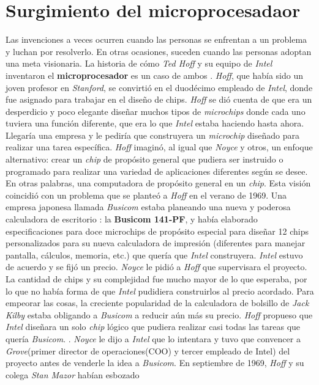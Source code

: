 \section{Surgimiento del microprocesadaor}
Las invenciones a veces ocurren cuando las personas se enfrentan a un problema y luchan por resolverlo. En otras ocasiones, suceden 
cuando las personas adoptan una meta visionaria. La historia de cómo \emph{Ted Hoff} y su equipo de \emph{Intel} inventaron el \textbf
{microprocesador} es un caso de ambos . \emph{Hoff}, que había sido un joven profesor en \emph{Stanford}, se
convirtió en el duodécimo empleado de \emph{Intel}, donde fue asignado para trabajar en el diseño de chips. \emph{Hoff} se dió cuenta de que era un
desperdicio y poco elegante diseñar muchos tipos de \emph{microchips} donde cada uno tuviera una función diferente,  que era lo que \emph{Intel} 
estaba haciendo hasta ahora. Llegaría una empresa y le pediría que construyera un \emph{microchip} diseñado para realizar una tarea
específica. \emph{Hoff} imaginó, al igual que \emph{Noyce} y otros, un enfoque alternativo: crear un \emph{chip} de propósito general que pudiera
ser instruido o programado para realizar una variedad de aplicaciones diferentes según se desee. En otras palabras, una computadora de propósito
general en un \emph{chip}. Esta visión coincidió con un problema que se planteó a \emph{Hoff} en el verano de 1969. Una empresa japonesa llamada
\emph {Busicom} estaba planeando una nueva y poderosa calculadora de escritorio : la \textbf{Busicom 141-PF}, y había elaborado especificaciones para
doce microchips de propósito especial para diseñar 12 chips personalizados para su nueva calculadora de impresión (diferentes para manejar pantalla,
cálculos, memoria, etc.) que quería que \emph{Intel} construyera. \emph{Intel} estuvo de acuerdo y se fijó un precio. \emph{Noyce} le pidió a \emph
{Hoff} que supervisara el proyecto. La cantidad de chips y su complejidad fue mucho mayor de lo que esperaba, por lo que no había forma de que \emph
{Intel} pudidiera construirlos al precio acordado. Para empeorar las cosas,  la creciente popularidad de la calculadora de bolsillo de \emph{Jack Kilby} estaba
obligando a \emph{Busicom} a reducir aún más su precio. \emph{Hoff} propueso que  \emph{Intel} diseñara un solo \emph{chip} lógico que pudiera realizar casi todas las
tareas que quería \emph{Busicom}. . \emph{Noyce} le dijo a \emph{Intel} que lo intentara y tuvo que convencer a \emph{Grove}(primer director de operaciones(COO) y 
tercer empleado de Intel) del proyecto antes de venderle la idea a \emph{Busicom}. En septiembre de 1969, \emph{Hoff} y su colega \emph{Stan Mazor} habían esbozado
